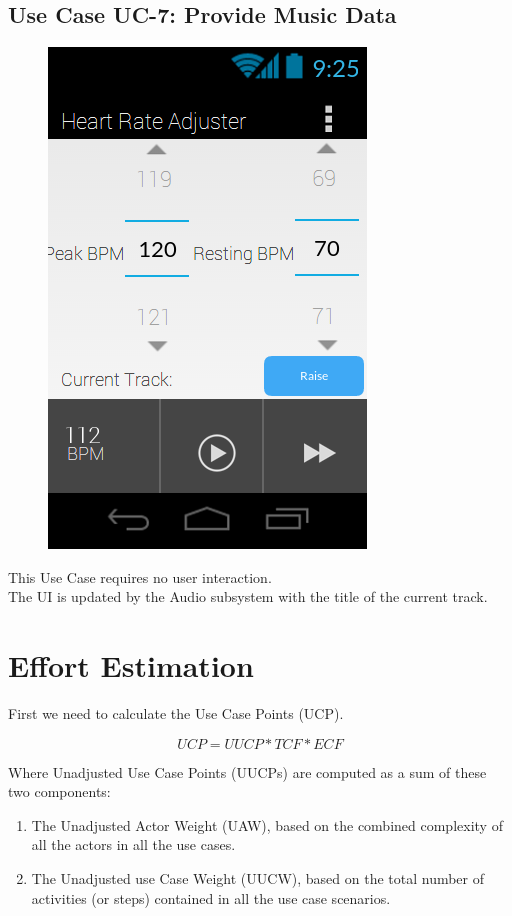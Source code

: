 \documentclass[letterpaper,english, 12pt]{scrreprt}
\begin{document}
\subsection{Use Case UC-7: Provide Music Data}
\begin{figure}[H]
	\centering
	\includegraphics{img/mobile_ui/1.png}\\
\end{figure}

This Use Case requires no user interaction.\\
The UI is updated by the Audio subsystem with the title of the current track.

\section{Effort Estimation}

First we need to calculate the Use Case Points (UCP).

\begin{equation}
UCP = UUCP* TCF *ECF
\end{equation}

Where Unadjusted Use Case Points (UUCPs) are computed as a sum of these two components:

\begin{enumerate}
\item The Unadjusted Actor Weight (UAW), based on the combined complexity of all the actors in all the use cases.
\item The Unadjusted use Case Weight (UUCW), based on the total number of activities (or steps) contained in all the use case scenarios.
\end{enumerate}
\end{document}
